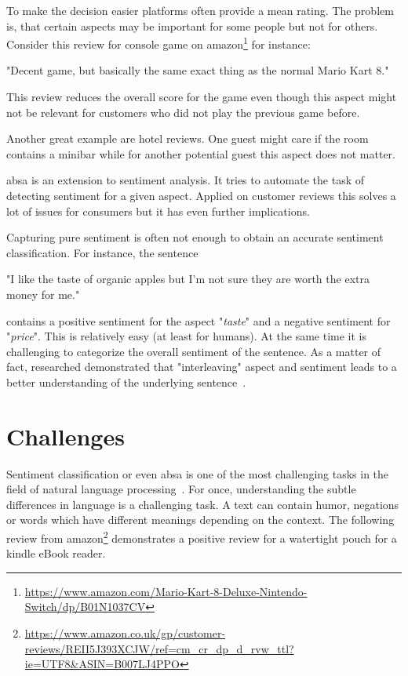To make the decision easier platforms often provide a mean rating. The problem is, that certain aspects may be important for some people but not for others. Consider this review for console game on amazon\footnote{\url{https://www.amazon.com/Mario-Kart-8-Deluxe-Nintendo-Switch/dp/B01N1037CV}} for instance:

\begin{center}
	"Decent game, but basically the same exact thing as the normal Mario Kart 8."
\end{center}

This review reduces the overall score for the game even though this aspect might not be relevant for customers who did not play the previous game before. 

Another great example are hotel reviews. One guest might care if the room contains a minibar while for another potential guest this aspect does not matter.
\bigskip

\acrfull{absa} is an extension to sentiment analysis. It tries to automate the task of detecting sentiment for a given aspect. Applied on customer reviews this solves a lot of issues for consumers but it has even further implications.
\medskip

Capturing pure sentiment is often not enough to obtain an accurate sentiment classification. For instance, the sentence

\begin{center}
	"I like the taste of organic apples but I'm not sure they are worth the extra money for me."
\end{center}

contains a positive sentiment for the aspect "\textit{taste}" and a negative sentiment for "\textit{price}". This is relatively easy {(at least for humans)}. At the same time it is challenging to categorize the overall sentiment of the sentence. As a matter of fact, researched demonstrated that "interleaving" aspect and sentiment leads to a better understanding of the underlying sentence~\cite{Lakkaraju2014}.


\section{Challenges}

Sentiment classification or even \acrfull{absa} is one of the most challenging tasks in the field of natural language processing~\cite{Pang2012}. For once, understanding the subtle differences in language is a challenging task. A text can contain humor, negations or words which have different meanings depending on the context. The following review from amazon\footnote{\url{https://www.amazon.co.uk/gp/customer-reviews/REII5J393XCJW/ref=cm_cr_dp_d_rvw_ttl?ie=UTF8&ASIN=B007LJ4PPO}} demonstrates a positive review for a watertight pouch for a kindle eBook reader.

